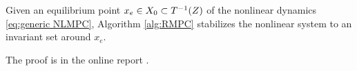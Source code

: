 
\begin{theorem}[Stability]
	\label{thm:stability}
Given an equilibrium point $x_e \in X_0 \subset T^{-1}(Z)$ of the nonlinear dynamics \eqref{eq:generic NLMPC}, Algorithm \ref{alg:RMPC} stabilizes the nonlinear system to an invariant set around $x_e$.
\end{theorem}
The proof is in the online report \cite{PantAM16_RMPC}.
